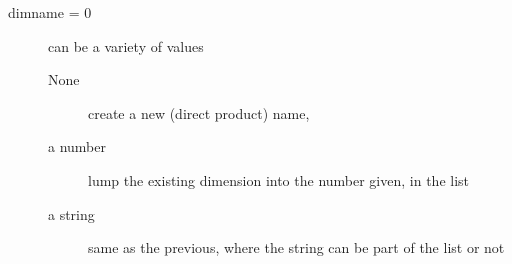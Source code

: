 \begin{mykwargs}
    \begin{description}
        \item[dimname = 0] can be a variety of values 
            \begin{description}
                \item[None]  create a new (direct product) name,
                \item[a number] lump the existing dimension into the number given, in the list
                \item[a string] same as the previous, where the string can be part of the list or not
            \end{description}

    \end{description}
\end{mykwargs}
